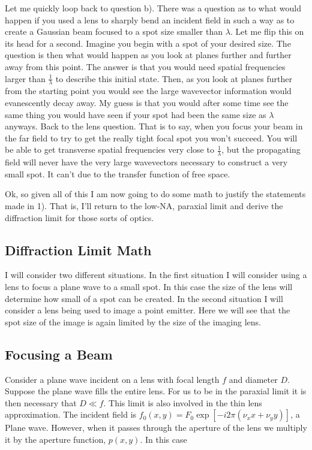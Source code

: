 \documentclass[12pt]{article}
\begin{document}
Let me quickly loop back to question b). There was a question as to what would happen if you used a lens to sharply bend an incident field in such a way as to create a Gaussian beam focused to a spot size smaller than $\lambda$. Let me flip this on its head for a second. Imagine you begin with a spot of your desired size. The question is then what would happen as you look at planes further and further away from this point. The answer is that you would need spatial frequencies larger than $\frac{1}{\lambda}$ to describe this initial state. Then, as you look at planes further from the starting point you would see the large wavevector information would evanescently decay away. My guess is that you would after some time see the same thing you would have seen if your spot had been the same size as $\lambda$ anyways. Back to the lens question. That is to say, when you focus your beam in the far field to try to get the really tight focal spot you won't succeed. You will be able to get transverse spatial frequencies very close to $\frac{1}{\lambda}$, but the propagating field will never have the very large wavevectors necessary to construct a very small spot. It can't due to the transfer function of free space.

Ok, so given all of this I am now going to do some math to justify the statements made in 1). That is, I'll return to the low-NA, paraxial limit and derive the diffraction limit for those sorts of optics.

\subsection{Diffraction Limit Math}

I will consider two different situations. In the first situation I will consider using a lens to focus a plane wave to a small spot. In this case the size of the lens will determine how small of a spot can be created. In the second situation I will consider a lens being used to image a point emitter. Here we will see that the spot size of the image is again limited by the size of the imaging lens.

\subsection{Focusing a Beam}
Consider a plane wave incident on a lens with focal length $f$ and diameter $D$. Suppose the plane wave fills the entire lens. For us to be in the paraxial limit it is then necessary that $D \ll f$. This limit is also involved in the thin lens approximation. The incident field is $f_0(x,y) = F_0 \exp[-i 2\pi (\nu_x x+\nu_y y)]$, a Plane wave. However, when it passes through the aperture of the lens we multiply it by the aperture function, $p(x,y)$. In this case
\end{document}
